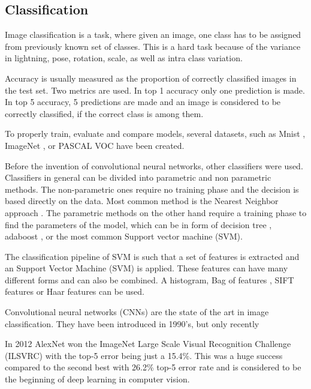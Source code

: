 \documentclass[a4paper,12pt,titlepage, twoside]{article}
\numberwithin{figure}{section}
\begin{document}
\subsection{Classification}

Image classification is a task, where given an image, one class has to be assigned from previously known set of classes. This is a hard task because of the variance in lightning, pose, rotation, scale, as well as intra class variation.  

Accuracy is usually measured as the proportion of correctly classified images in the test set. Two metrics are used. In top 1 accuracy only one prediction is made. In top 5 accuracy, 5 predictions are made and an image is considered to be correctly classified, if the correct class is among them.

To properly train, evaluate and compare models, several datasets, such as Mnist \cite{lecun-mnisthandwrittendigit-2010}, ImageNet \cite{deng2009imagenet}, or PASCAL VOC \cite{Everingham10} have been created.

Before the invention of convolutional neural networks, other classifiers were used. Classifiers in general can be divided into parametric and non parametric methods. The non-parametric ones require no training phase and the decision is based directly on the data. Most common method is the Nearest Neighbor approach \cite{boiman2008defense, zhang2006svm}. The parametric methods on the other hand require a training phase to find the parameters of the model, which can be in form of decision tree \cite{bosch2007image}, adaboost \cite{opelt2004weak}, or the most common Support vector machine (SVM).

The classification pipeline of SVM is such that a set of features is extracted and an Support Vector Machine (SVM) is applied. These features can have many different forms and can also be combined. A histogram\cite{chapelle1999support}, Bag of features \cite{lazebnik2006beyond, nowak2006sampling}, SIFT features \cite{yang2009linear, bicego2006use} or Haar features \cite{munder2006experimental} can be used.

Convolutional neural networks (CNNs) are the state of the art in image classification. They have been introduced in 1990's\cite{lecun1989backpropagation}, but only recently 

In 2012 AlexNet \cite{krizhevsky2012imagenet} won the ImageNet Large Scale Visual Recognition Challenge (ILSVRC) with the top-5 error being just a 15.4\%. This was a huge success compared to the second best with 26.2\% top-5 error rate and is considered to be the beginning of deep learning in computer vision. 
\end{document}
